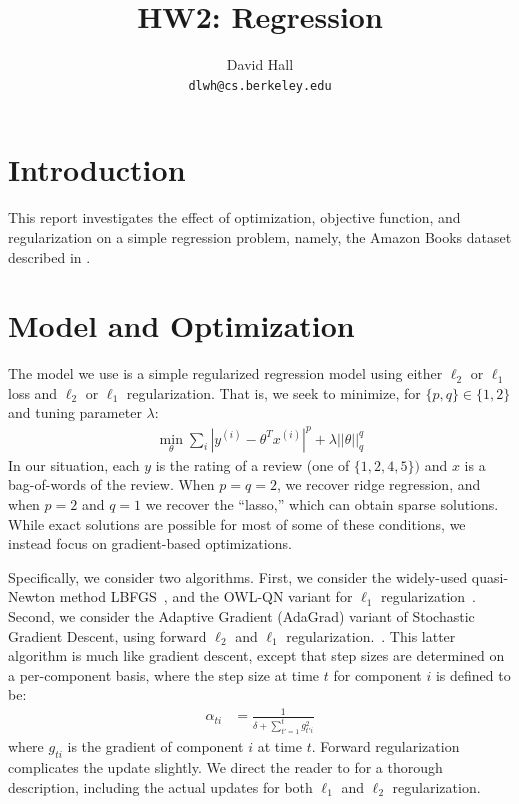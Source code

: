 \documentclass[11pt,leqno,twoside]{article}
\title{HW2: Regression}
\author{David Hall \\ \texttt{dlwh@cs.berkeley.edu}}
\begin{document}
\maketitle

\section{Introduction}

This report investigates the effect of optimization, objective
function, and regularization on a simple regression problem, namely,
the Amazon Books dataset described in \citet{Blitzer07Biographies}.

\section{Model and Optimization}

The model we use is a simple regularized regression model using either $\ell_2$ or $\ell_1$ loss and $\ell_2$ or $\ell_1$
regularization. That is, we seek to minimize, for $\{p,q\} \in \{1,2\}$ and tuning parameter $\lambda$:
\begin{equation*}
  \begin{split}
    \min_\theta \sum_i |y^{(i)} - \theta^T x^{(i)}|^p + \lambda ||\theta||_q^q
   \end{split}
 \end{equation*}
In our situation, each $y$ is the rating of a review (one of $\{1,2,4,5\})$ and $x$
is a bag-of-words of the review.
When $p=q=2$, we recover ridge regression, and when $p=2$ and $q=1$
we recover the ``lasso,'' which can obtain sparse solutions. While
exact solutions are possible for most of some of these conditions,
we instead focus on gradient-based optimizations.

Specifically, we consider two algorithms. First, we consider
the widely-used quasi-Newton method LBFGS~\citep{lbfgs}, and
the OWL-QN variant for $\ell_1$ regularization~\citep{Andrew07scalabletraining}.
Second, we consider the Adaptive Gradient (AdaGrad) variant of Stochastic Gradient Descent,
using forward $\ell_2$ and $\ell_1$ regularization.~\citep{duchi10adaptive}. This latter algorithm
is much like gradient descent, except that step sizes are determined on a per-component basis, where
the step size at time $t$ for component $i$ is defined to be:
\begin{equation}
  \begin{split}
    \alpha_{ti} &= \frac1{\delta + \sum_{t'=1}^t g_{t'i}^2}
   \end{split}
 \end{equation}
 where $g_{ti}$ is the gradient of component $i$ at time $t$. Forward regularization complicates the
 update slightly. We direct the reader to \citet{duchi10adaptive} for a thorough description, including
 the actual updates for both $\ell_1$ and $\ell_2$ regularization.
\end{document}

